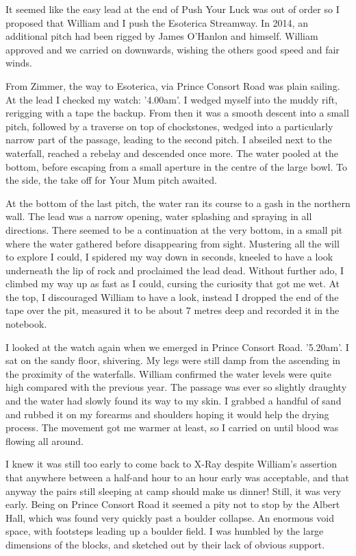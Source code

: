 It seemed like the easy lead at the end of Push Your Luck was out of order so I proposed that William and I push the Esoterica Streamway. In 2014, an additional pitch had been rigged by James O'Hanlon and himself. William approved and we carried on downwards, wishing the others good speed and fair winds. 

From Zimmer, the way to Esoterica, via Prince Consort Road was plain sailing. At the lead I checked my watch: '4.00am'. I wedged myself into the muddy rift, rerigging with a tape the backup. From then it was a smooth descent into a small pitch, followed by a traverse on top of chockstones, wedged into a particularly narrow part of the passage, leading to the second pitch. I abseiled next to the waterfall, reached a rebelay and descended once more. The water pooled at the bottom, before escaping from a small aperture in the centre of the large bowl. To the side, the take off for Your Mum pitch awaited. 

At the bottom of the last pitch, the water ran its course to a gash in the northern wall. The lead was a narrow opening, water splashing and spraying in all directions. There seemed to be a continuation at the very bottom, in a small pit where the water gathered before disappearing from sight. Mustering all the will to explore I could, I spidered my way down in seconds, kneeled to have a look underneath the lip of rock and proclaimed the lead dead. Without further ado, I climbed my way up as fast as I could, cursing the curiosity that got me wet. At the top, I discouraged William to have a look, instead I dropped the end of the tape over the pit, measured it to be about 7 metres deep and recorded it in the notebook. 

I looked at the watch again when we emerged in Prince Consort Road. '5.20am'. I sat on the sandy floor, shivering. My legs were still damp from the ascending in the proximity of the waterfalls. William confirmed the water levels were quite high compared with the previous year. The passage was ever so slightly draughty and the water had slowly found its way to my skin. I grabbed a handful of sand and rubbed it on my forearms and shoulders hoping it would help the drying process. The movement got me warmer at least, so I carried on until blood was flowing all around. 

I knew it was still too early to come back to X-Ray despite William's assertion that anywhere between a half-and hour to an hour early was acceptable, and that anyway the pairs still sleeping at camp should make us dinner! Still, it was very early. Being on Prince Consort Road it seemed a pity not to stop by the Albert Hall, which was found very quickly past a boulder collapse. An enormous void space, with footsteps leading up a boulder field. I was humbled by the large dimensions of the blocks, and sketched out by their lack of obvious support. 

